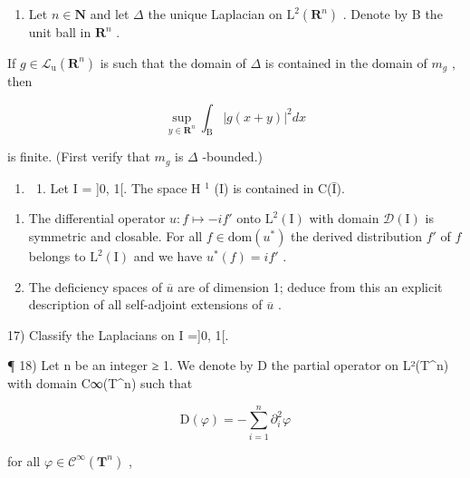 \begin{enumerate}
\def\labelenumi{\arabic{enumi})}
\setcounter{enumi}{14}
\tightlist
\item
  Let \(n \in \mathbf{N}\) and let \(\Delta\) the unique Laplacian on \(\mathrm{L}^2(\mathbf{R}^n)\) . Denote by B the unit ball in \(\mathbf{R}^n\) .
\end{enumerate}

If \(g \in \mathcal{L}_{\mathrm{u}}(\mathbf{R}^{n})\) is such that the domain of \(\Delta\) is contained in the domain of \(m_{g}\) , then

\[
\sup _ {y \in \mathbf {R} ^ {n}} \int_ {\mathrm{B}} | g (x + y) | ^ {2} d x
\]

is finite. (First verify that \(m_{g}\) is \(\Delta\) -bounded.)

\begin{enumerate}
\def\labelenumi{\arabic{enumi})}
\setcounter{enumi}{15}
\tightlist
\item
  \begin{enumerate}
  \def\labelenumii{\alph{enumii})}
  \tightlist
  \item
    Let I = {]}0, 1{[}. The space H \(^{1}\) (I) is contained in C(Ī).
  \end{enumerate}
\end{enumerate}

\begin{enumerate}
\def\labelenumi{\alph{enumi})}
\setcounter{enumi}{1}
\item
  The differential operator \(u\colon f\mapsto -if'\) onto \(\mathrm{L}^2 (\mathrm{I})\) with domain \(\mathcal{D}(\mathrm{I})\) is symmetric and closable. For all \(f\in \mathrm{dom}(u^{*})\) the derived distribution \(f'\) of \(f\) belongs to \(\mathrm{L}^2 (\mathrm{I})\) and we have \(u^{*}(f) = if'\) .
\item
  The deficiency spaces of \(\overline{u}\) are of dimension 1; deduce from this an explicit description of all self-adjoint extensions of \(\overline{u}\) .
\end{enumerate}

17) Classify the Laplacians on I ={]}0, 1{[}.

¶ 18) Let n be an integer ≥ 1. We denote by D the partial operator on L²(T\^{}n) with domain C∞(T\^{}n) such that

\[
\mathrm{D} (\varphi) = - \sum_ {i = 1} ^ {n} \partial_ {i} ^ {2} \varphi
\]

for all \(\varphi\in\mathcal{C}^{\infty}(\mathbf{T}^{n})\) ,

